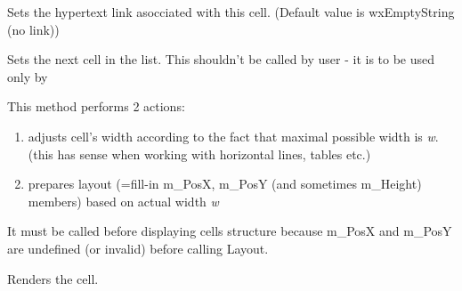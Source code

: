 \label{wxhtmlcellsetlink}


Sets the hypertext link asocciated with this cell. (Default value
is wxEmptyString (no link))

\label{wxhtmlcellsetnext}


Sets the next cell in the list. This shouldn't be called by user - it is 
to be used only by 

\label{wxhtmlcelllayout}


This method performs 2 actions:

\begin{enumerate}
\item adjusts cell's width according to the fact that maximal possible width is {\it w}.
(this has sense when working with horizontal lines, tables etc.)
\item prepares layout (=fill-in m\_PosX, m\_PosY (and sometimes m\_Height) members)
based on actual width {\it w}
\end{enumerate}

It must be called before displaying cells structure because 
m\_PosX and m\_PosY are undefined (or invalid) 
before calling Layout. 

\label{wxhtmlcelldraw}


Renders the cell.






